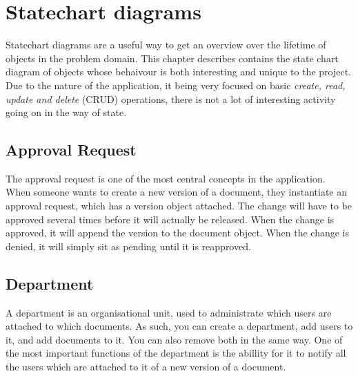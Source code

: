 \section{Statechart diagrams}
Statechart diagrams are a useful way to get an overview over the lifetime of objects in the problem domain.
This chapter describes contains the state chart diagram of objects whose behaivour is both interesting and unique to the project.
Due to the nature of the application, it being very focused on basic \textit{create, read, update and delete} (CRUD) operations, there is not a lot of interesting activity going on in the way of state.

\subsection{Approval Request}
The approval request is one of the most central concepts in the application.
When someone wants to create a new version of a document, they instantiate an approval request, which has a version object attached.
The change will have to be approved several times before it will actually be released.
When the change is approved, it will append the version to the document object. When the change is denied, it will simply sit as pending until it is reapproved.


\subsection{Department}
A department is an organisational unit, used to administrate which users are attached to which documents.
As such, you can create a department, add users to it, and add documents to it.
You can also remove both in the same way.
One of the most important functions of the department is the abillity for it to notify all the users which are attached to it of a new version of a document.

